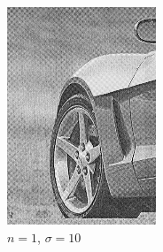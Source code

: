 \documentclass[
	12pt, %
]{style/fphw}
\begin{document}
\begin{figure}[H]
    \centering
        \begin{subfigure}[b]{.22\textwidth}
             \centering
             \includegraphics[width=\textwidth]{plots2/Q5_3_1_10.png}
             \caption{$n=1$, $\sigma=10$}
             \label{Q5_3_1_10}
         \end{subfigure}
         \hfill
         \begin{subfigure}[b]{.22\textwidth}
             \centering

\end{subfigure}
\end{figure}
\end{document}
